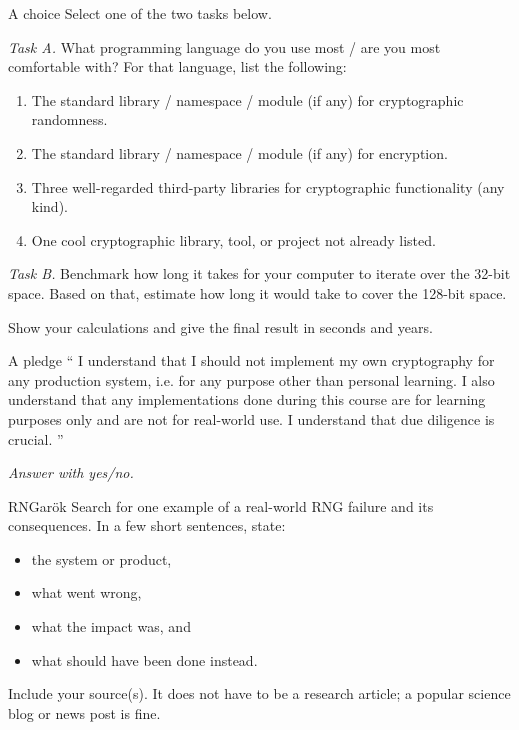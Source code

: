 \documentclass{homework}
\begin{document}
\begin{task}{A choice}
  Select one of the two tasks below.

  \textit{Task A.}
  What programming language do you use most / are you most comfortable with?
  For that language, list the following:
  \begin{enumerate}
    \item The standard library / namespace / module (if any) for cryptographic randomness.
    \item The standard library / namespace / module (if any) for encryption.
    \item Three well-regarded third-party libraries for cryptographic functionality (any kind).
    \item One cool cryptographic library, tool, or project not already listed.
  \end{enumerate}

  \textit{Task B.}
  Benchmark how long it takes for your computer to iterate over the 32-bit space.
  Based on that, estimate how long it would take to cover the 128-bit space.

  Show your calculations and give the final result in seconds and years.
\end{task}

\begin{task}{A pledge}
  \enquote{%
    I understand that I should not implement my own cryptography for any production system, i.e. for any purpose other than personal learning.
    I also understand that any implementations done during this course are for learning purposes only and are not for real-world use.
    I understand that due diligence is crucial.%
  }

  \textit{Answer with yes/no.}
\end{task}

\newpage

\begin{task}{RNGarök}
  Search for one example of a real-world RNG failure and its consequences.
  In a few short sentences, state:
  \begin{itemize}
    \item the system or product,
    \item what went wrong,
    \item what the impact was, and
    \item what should have been done instead.
  \end{itemize}

  Include your source(s).
  It does not have to be a research article; a popular science blog or news post is fine.
\end{task}
\end{document}
